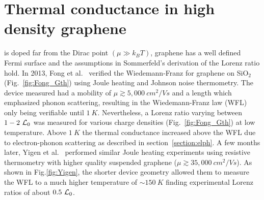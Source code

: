 \chapter{Thermal conductance in high density graphene}
\label{ch:thermal_conductance_in_high_density_graphene}
 is doped far from the Dirac point $(\mu\gg k_BT)$, graphene has a well defined Fermi surface and the assumptions in Sommerfeld's derivation of the Lorenz ratio hold. In 2013, Fong et al.~\cite{fong_measurement_2013} verified the Wiedemann-Franz for graphene on SiO$_2$ (Fig.~\ref{fig:Fong_Gth}) using Joule heating and Johnson noise thermometry. The device measured had a mobility of $\mu \gtrsim 5,000~cm^2/Vs$ and a length which emphasized phonon scattering, resulting in the Wiedemann-Franz law (WFL) only being verifiable until $1~K$. Nevertheless, a Lorenz ratio varying between $1-2~\mathcal{L}_0$ was measured for various charge densities (Fig.~\ref{fig:Fong_Gth}) at low temperature. Above $1~K$ the thermal conductance increased above the WFL due to electron-phonon scattering as described in section~\ref{section:elph}. A few months later, Yigen et al.~\cite{yigen_wiedemannfranz_2014} performed similar Joule heating experiments using resistive thermometry with higher quality suspended graphene ($\mu \gtrsim 35,000~cm^2/Vs$). As shown in Fig.\ref{fig:Yigen}, the shorter device geometry allowed them to measure the WFL to a much higher temperature of ${\sim}150~K$ finding experimental Lorenz ratios of about $0.5~\mathcal{L}_0$.
